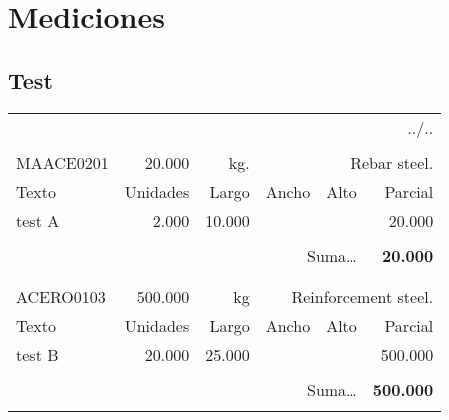 \documentclass{book}%
\begin{document}
%
\normalsize%
\part{Mediciones}%
\label{sec:Mediciones}%
\chapter{Test}%
\label{sec:Test}%
\begin{longtable}{lrrrrr}%
\multicolumn{6}{r}{../..}\\%
\endfoot%
\endlastfoot%
&&&&&\\%
MAACE0201&20.000& kg.&\multicolumn{3}{p{6cm}}{\scriptsize Rebar steel.\normalsize}\\%
Texto&Unidades&Largo&Ancho&Alto&Parcial\\%
\hline%
\multicolumn{1}{p{3.5cm}}{test A}&2.000&10.000&&&20.000\\%
&&&&&\\%
\multicolumn{5}{r}{Suma\ldots}&\textbf{20.000}\\%
\hline%
&&&&&\\%
&&&&&\\%
ACERO0103&500.000& kg&\multicolumn{3}{p{6cm}}{\scriptsize Reinforcement steel.\normalsize}\\%
Texto&Unidades&Largo&Ancho&Alto&Parcial\\%
\hline%
\multicolumn{1}{p{3.5cm}}{test B}&20.000&25.000&&&500.000\\%
&&&&&\\%
\multicolumn{5}{r}{Suma\ldots}&\textbf{500.000}\\%
\hline%
&&&&&\\%
\end{longtable}%
\newpage

%
\end{document}
